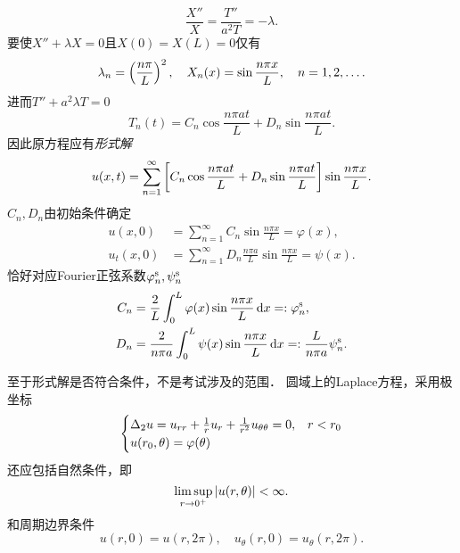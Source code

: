 \[\frac{X''}X=\frac{T''}{a^2T}=-\lambda.\]
要使$X''+\lambda X=0$且$X(0)=X(L)=0$仅有
\[\lambda_n=\left(\frac{n\pi}L\right)^2,\quad X_n(x)=\sin\frac{n\pi x}L,\quad n=1,2,\ldots.\]
进而$T''+a^2\lambda T=0$
\[T_n(t)=C_n\cos\frac{n\pi at}L+D_n\sin\frac{n\pi at}L.\]
因此原方程应有\textit{形式解}
\begin{align}
	u(x,t)=\sum_{n=1}^\infty\left[C_n\cos\frac{n\pi at}L+D_n\sin\frac{n\pi at}L\right]\sin\frac{n\pi x}L.
\end{align}
$C_n,D_n$由初始条件确定
\begin{align*}
	u(x,0)&=\sum_{n=1}^\infty C_n\sin\frac{n\pi x}L=\varphi(x),            \\
	u_t(x,0)&=\sum_{n=1}^\infty D_n\frac{n\pi a}L\sin\frac{n\pi x}L=\psi(x).
\end{align*}
恰好对应Fourier正弦系数$\varphi^{\mathrm s}_n,\psi^{\mathrm s}_n$
\begin{align*}
	C_n & =\frac2L\int_0^L\varphi(x)\sin\frac{n\pi x}L\mathop{}\!\mathrm{d} x=:\varphi_n^{\mathrm s},                  \\
	D_n & =\frac2{n\pi a}\int_0^L\psi(x)\sin\frac{n\pi x}L\mathop{}\!\mathrm{d} x=:\frac{L}{n\pi a}\psi_n^{\mathrm s}.
\end{align*}

至于形式解是否符合条件，不是考试涉及的范围．
\eg[2] 圆域上的Laplace方程，采用极坐标
\begin{align*}
	\begin{cases}
		\Delta_2u=u_{rr}+\frac1ru_r+\frac1{r^2}u_{\theta\theta}=0,&r<r_0\\
		u(r_0,\theta)=\varphi(\theta)
	\end{cases}
\end{align*}
还应包括自然条件，即
\[\limsup_{r\to0^+}\left\lvert u(r,\theta)\right\rvert<\infty.\]
和周期边界条件
\[u(r,0)=u(r,2\pi),\quad u_\theta(r,0)=u_\theta(r,2\pi).\]

